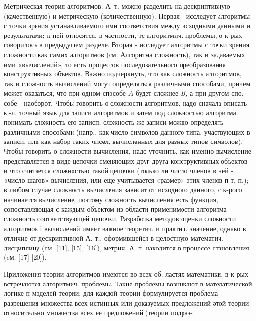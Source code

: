 \documentclass[10pt]{article}
\begin{document}
Метрическая теория алгоритмов. А. т. можно разделить на дескриптивную (качественную) и метрическую (количественную). Первая - исследует алгоритмы с точки зрения устанавливаемого ими соответствия между исходными данными и результатами; к ней относятся, в частности, те алгоритмич. проблемы, о к-рых говорилось в предыдушем разделе. Вторая - исследует алгоритмы с точки зрения сложности как самих алгоритмов (см. Алгоритма сложность), так и задаваемых ими «вычислений», то есть процессов последовательного преобразования конструктивных объектов. Важно подчеркнуть, что как сложность алгоритмов, так и сложность вычислений могут определяться различными способами, причем может оказаться, что при одном способе $A$ будет сложнее $B$, а при другом спо. собе - наоборот. Чтобы говорить о сложности алгоритмов, надо сначала описать к.-л. точный язык для записи алгоритмов и затем под сложностью алгоритма понимать сложность его записп; сложность же записи можно определять различными способами (напр., как число символов данного типа, участвующих в записи, или как набор таких чисел, вычисленных для разных типов символов). Чтобы говорить о сложности вычисления, надо уточнить, как именно вычисление представляется в виде цепочки сменяющих друг друга конструктивных объектов и что считается сложностью такой цепочки (только ли число членов в ней - «число шагов» вычисления, или еще учитывается «размер» этих членов п т. п.); в любом случае сложность вычисления зависит от исходного данного, с к-рого начинается вычисление, поэтому сложность вычисления есть функция, сопоставляющая с каждым объектом из области применимости алгоритма сложность соответствующей цепочки. Разработка методов оценки сложности алгоритмов і вычислений имеет важное теоретич. и практич. значение, однако в отличие от дескриптивной А. т., оформившейся в целостную математич. дисциплину (см. [11], [15], [16]), метрич. А. т. находится в процессе становления (cм. [17]-[20]).



Приложения теории алгоритмов имеются во всех об. ластях математики, в к-рых встречаются алгоритмич. проблемы. Такие проблемы возникают в мателатической логике п моделей теории; для каждой теории формулируется проблема разрешения множества всех истинных или доказуемых предложений әтой теории относительно множества всех ее предложений (теории подраз-
\end{document}
